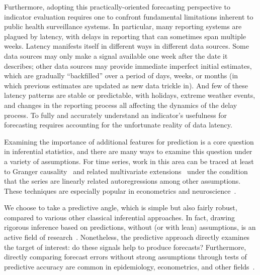 \documentclass[9pt,twocolumn,twoside,lineno]{pnas-new}
\begin{document}
Furthermore, adopting this practically-oriented forecasting
perspective to indicator evaluation requires one to confront
fundamental limitations inherent to public health surveillance
systems.  In particular, many reporting systems are plagued by
latency, with delays in reporting that can sometimes span
multiple weeks.  Latency manifests itself in different ways in different data sources.  Some data sources may only make a signal available one week after the date it describes; other
data sources may provide immediate imperfect initial estimates, which are
gradually ``backfilled'' over a period of days, weeks, or months (in which previous estimates are updated as new
data trickle in).  And few of
these latency patterns are stable or predictable, with holidays,
extreme weather events, and changes in the reporting process all
affecting the dynamics of the delay process.  To fully and accurately
understand an indicator's usefulness for forecasting requires
accounting for the unfortunate reality of data latency.



Examining the importance of additional features for prediction is a core question
in inferential statistics, and there are many ways to examine this question
under a variety of assumptions. For time series, work in
this area can be traced at least to Granger causality~\cite{GrangerCausality} and
related multivariate extensions~\cite{GewekeTimeSeries} under the condition 
that the series are linearly related autoregressions among other assumptions.
These techniques are especially popular in econometrics and neuroscience~\cite{mccracken2007asymptotics,NeuroscienceGranger}.

We choose to take a
predictive angle, which is simple but also fairly robust, compared to various
other classical inferential approaches. In fact, drawing rigorous inference based on
predictions, without (or with lean) assumptions, is an active field of
research~\cite{dai2021significance,fryer2021shapley,zhang2020floodgate,williamson2020unified}.
Nonetheless, the predictive approach directly examines the target of interest: do
these signals help to produce forecasts? Furthermore, directly comparing
forecast errors without strong assumptions through tests of predictive accuracy
are common in epidemiology, econometrics, and other
fields~\cite{DieboldMarianoTest,DieboldRetrospective}. 

\end{document}
